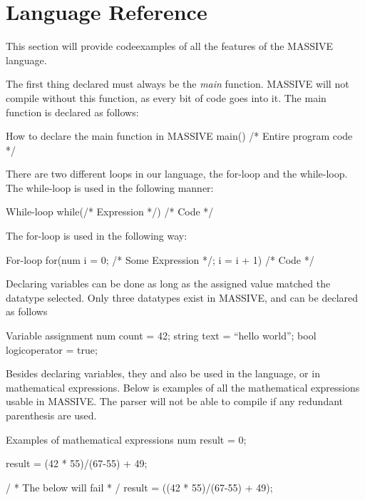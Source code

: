 \section{Language Reference}
\label{sec:language_reference}

This section will provide codeexamples of all the features of the MASSIVE language.

The first thing declared must always be the \textit{main} function. MASSIVE will not compile without this function, as every bit of code goes into it.
The main function is declared as follows:

\begin{source}{How to declare the main function in MASSIVE}{}
main()
{
		/* Entire program code */
}
\end{source}

There are two different loops in our language, the for-loop and the while-loop.\\
The while-loop is used in the following manner:
\begin{source}{While-loop}{}
while(/* Expression */)
{
		/* Code */
}
\end{source}

The for-loop is used in the following way:
\begin{source}{For-loop}{}
for(num i = 0; /* Some Expression */; i = i + 1)
{
		/* Code */
}
\end{source}

Declaring variables can be done as long as the assigned value matched the datatype selected. Only three datatypes exist in MASSIVE, and can be declared as follows

\begin{source}{Variable assignment}{}
num count = 42;
string text = ``hello world'';
bool logicoperator = true;
\end{source}

Besides declaring variables, they and also be used in the language, or in mathematical expressions. Below is examples of all the mathematical expressions usable in MASSIVE. The parser will not be able to compile if any redundant parenthesis are used.

\begin{source}{Examples of mathematical expressions}{}
num result = 0;

result = (42 * 55)/(67-55) + 49;

/ * The below will fail * /
result = ((42 * 55)/(67-55) + 49);

\end{source}

